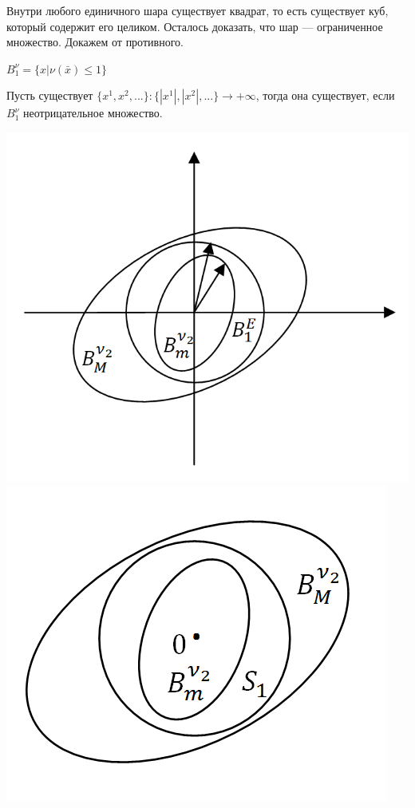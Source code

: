 \documentclass[a4paper,12pt]{article}
\begin{document}
\begin{defintion}
Внутри любого единичного шара существует квадрат, то есть существует куб, который содержит его целиком. Осталось доказать, что шар --- ограниченное множество. Докажем от противного.\begin{center}
	$B_1^{\nu} = \{x | \nu(\bar x) \leqslant 1\}$\end{center}
Пусть существует $\{x^1, x^2,...\}: \{|x^1|, |x^2|,...\} \rightarrow +\infty$, тогда она существует, если $B_1^{\nu}$ неотрицательное множество.\begin{center}
	\includegraphics[scale=0.55]{l5_7.png}
	\includegraphics[scale=0.55]{l5_9.png}

\end{center}
\end{defintion}
\end{document}
